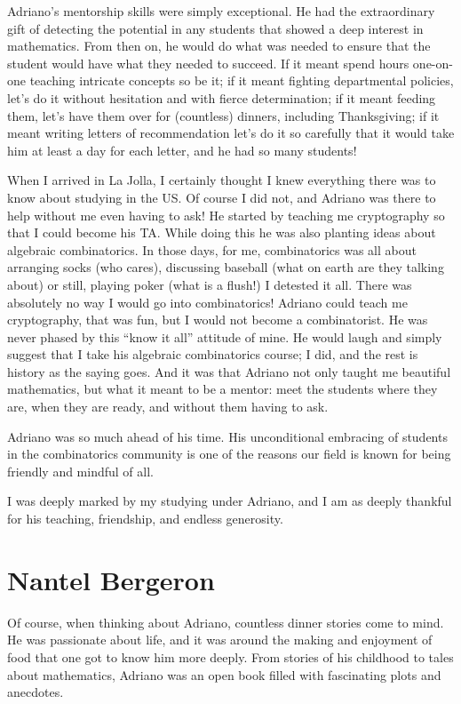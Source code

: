 \documentclass{notices}
\begin{document}
Adriano's mentorship skills were simply exceptional.  He had the extraordinary gift of detecting the potential in any students that showed a deep interest in mathematics. From then on, he would do what was needed to ensure that the student would have what they needed to succeed. If it meant spend hours one-on-one teaching intricate concepts so be it; if it meant fighting  departmental policies, let's do it without hesitation and with fierce determination; if it meant feeding them, let's have them over for (countless) dinners, including Thanksgiving; if it meant writing letters of recommendation let's do it so carefully that it would take him at least a day for each letter, and he had so many students!

When I arrived in La Jolla, I certainly thought I knew everything there was to know about studying in the US. Of course I did not, and Adriano was there to help without me even having to ask!   He started by teaching me cryptography so that I could become his TA. While doing this he was also planting ideas about algebraic combinatorics. In those days, for me, combinatorics was all about arranging socks (who cares), discussing baseball (what on earth are they talking about) or still, playing poker (what is a flush!) I detested it all. There was absolutely no way I would go into combinatorics! Adriano could teach me cryptography, that was fun, but I would not become a combinatorist. He was never phased by this ``know it all'' attitude of mine. He would laugh and simply suggest that I take his algebraic combinatorics course; I did, and the rest is history as the saying goes. And it was that Adriano not only taught me beautiful mathematics, but what it meant to be a mentor: meet the students where they are, when they are ready, and without them having to ask.

Adriano was so much ahead of his time. His unconditional embracing of students in the combinatorics community is one of the reasons our field is known for being friendly and mindful of all.

I was deeply marked by my studying under Adriano, and I am as deeply thankful for his teaching, friendship, and endless generosity. 

\section*{Nantel Bergeron}
Of course, when thinking about Adriano, countless dinner stories come to mind. He was passionate about life, and it was around the making and enjoyment of food that one got to know him more deeply. From stories of his childhood to tales about mathematics, Adriano was an open book filled with fascinating plots and anecdotes.
\end{document}
